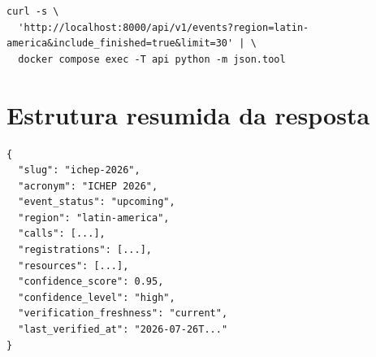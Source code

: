 \begin{lstlisting}
curl -s \
  'http://localhost:8000/api/v1/events?region=latin-america&include_finished=true&limit=30' | \
  docker compose exec -T api python -m json.tool
\end{lstlisting}

\section{Estrutura resumida da resposta}

\begin{lstlisting}
{
  "slug": "ichep-2026",
  "acronym": "ICHEP 2026",
  "event_status": "upcoming",
  "region": "latin-america",
  "calls": [...],
  "registrations": [...],
  "resources": [...],
  "confidence_score": 0.95,
  "confidence_level": "high",
  "verification_freshness": "current",
  "last_verified_at": "2026-07-26T..."
}
\end{lstlisting}
